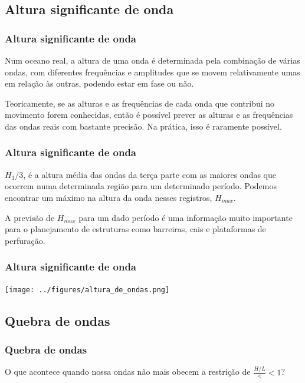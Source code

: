 \subsection{Altura significante de onda}
\begin{frame}
\frametitle{Altura significante de onda}
  {\small
  \begin{block}{}
    Num oceano real, a altura de uma onda é determinada pela combinação de
    várias ondas, com diferentes frequências e amplitudes que se movem
    relativamente umas em relação às outras, podendo estar em fase ou não.

    Teoricamente, se as alturas e as frequências de cada onda que contribui no
    movimento forem conhecidas, então é possível prever as alturas e as
    frequências das ondas reais com bastante precisão. Na prática, isso é
    raramente possível.
  \end{block}
  }
\end{frame}


\begin{frame}
\frametitle{Altura significante de onda}
  {\small
  \begin{block}{}
  $H_1/3$, é a altura média das ondas da terça parte com as maiores ondas que
  ocorrem numa determinada região para um determinado período.  Podemos
  encontrar um máximo na altura da onda nesses registros, $H_{max}$.

  A previsão de $H_{max}$ para um dado período é uma informação muito
  importante para o planejamento de estruturas como barreiras, cais e
  plataformas de perfuração.
  \end{block}
  }
\end{frame}


\begin{frame}
\frametitle{Altura significante de onda}
  \begin{center}
    \texttt{[image: ../figures/altura\_de\_ondas.png]}
  \end{center}
\end{frame}


\subsection{Quebra de ondas}
\begin{frame}
\frametitle{Quebra de ondas}
  \begin{block}{}
    O que acontece quando nossa ondas não mais obecem a restrição de $\frac{H/L} << 1$?
  \end{block}
\end{frame}

